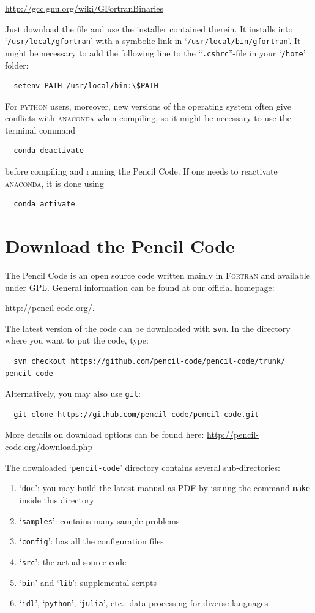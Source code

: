 \documentclass[a4paper,12pt]{article}
\newcommand{\command}[1]{\texttt{#1}}
\newcommand{\file}[1]{``\texttt{#1}''}
\newcommand{\directory}[1]{`\texttt{#1}'}
\newcommand{\name}[1]{\textsc{#1}}
\begin{document}
\url{http://gcc.gnu.org/wiki/GFortranBinaries}

Just download the file and use the installer contained therein.
It installs into \directory{/usr/local/gfortran} with
a symbolic link in \directory{/usr/local/bin/gfortran}. It might be necessary to add
the following line to the \file{.cshrc}-file in your \directory{/home} folder:
\begin{verbatim}
  setenv PATH /usr/local/bin:\$PATH
\end{verbatim} 
For \name{python} users, moreover, new versions of the operating system often give conflicts with \name{anaconda} when compiling, so it might be necessary to use the terminal command 
\begin{verbatim}
  conda deactivate
\end{verbatim}
before compiling and running the Pencil Code.
If one needs to reactivate \name{anaconda}, it is done using
\begin{verbatim}
  conda activate
\end{verbatim}

\section{Download the Pencil Code}
\label{sec:download}
The Pencil Code is an open source code written mainly in \name{Fortran} and available under GPL.
General information can be found at our official homepage:

\url{http://pencil-code.org/}.

The latest version of the code can be downloaded with \command{svn}. In the
directory where you want to put the code, type:
\begin{verbatim}
  svn checkout https://github.com/pencil-code/pencil-code/trunk/ pencil-code
\end{verbatim}

Alternatively, you may also use \command{git}:
\begin{verbatim}
  git clone https://github.com/pencil-code/pencil-code.git
\end{verbatim}

More details on download options can be found here: \url{http://pencil-code.org/download.php}

The downloaded \directory{pencil-code} directory contains several sub-directories:
\begin{enumerate}
  \item \directory{doc}: you may build the latest manual as PDF by issuing the command \command{make} inside this directory
  \item \directory{samples}: contains many sample problems
  \item \directory{config}: has all the configuration files
  \item \directory{src}: the actual source code
  \item \directory{bin} and \directory{lib}: supplemental scripts
  \item \directory{idl}, \directory{python}, \directory{julia}, etc.: data processing for diverse languages
\end{enumerate}
\end{document}
